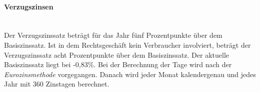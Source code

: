 \paragraph{Verzugszinsen} ~\\
Der Verzugszinssatz beträgt für das Jahr fünf Prozentpunkte über dem Basiszinssatz. Ist in dem Rechtsgeschäft kein Verbraucher involviert, beträgt der Verzugszinssatz acht Prozentpunkte über dem Basiszinssatz. Der aktuelle Basiszinssatz liegt bei -0,83\%. Bei der Berechnung der Tage wird nach der {\it Eurozinsmethode} vorgegangen. Danach wird jeder Monat kalendergenau und jedes Jahr mit 360 Zinstagen berechnet.

